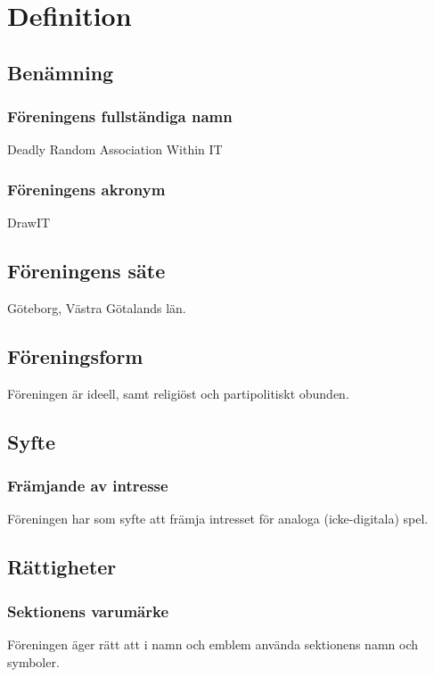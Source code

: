 \section{Definition}

\subsection{Benämning}

\subsubsection{Föreningens fullständiga namn}
Deadly Random Association Within IT

\subsubsection{Föreningens akronym}
DrawIT



\subsection{Föreningens säte}
Göteborg, Västra Götalands län.



\subsection{Föreningsform} \label{sec:föreningsform}
Föreningen är ideell, samt religiöst och partipolitiskt obunden.



\subsection{Syfte} \label{sec:syfte}

\subsubsection{Främjande av intresse}
Föreningen har som syfte att främja intresset för analoga (icke-digitala) spel.



\subsection{Rättigheter}

\subsubsection{Sektionens varumärke}
Föreningen äger rätt att i namn och emblem använda sektionens namn och symboler.



